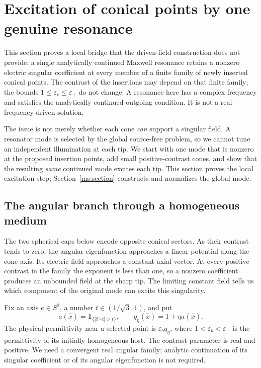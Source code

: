 \section{Excitation of conical points by one genuine resonance}
\label{hs:modal-next-section}

This section proves a local bridge that the driven-field construction
does not provide: a single analytically continued Maxwell resonance
retains a nonzero electric singular coefficient at every member of a
finite family of newly inserted conical points.  The contrast of the
insertions may depend on that finite family; the bounds
$1\leq\varepsilon_r\leq\varepsilon_+$ do not change.  A resonance here
has a complex frequency and satisfies the analytically continued
outgoing condition.  It is not a real-frequency driven solution.

The issue is not merely whether each cone \emph{can} support a singular
field.  A resonator mode is selected by the global source-free problem,
so we cannot tune an independent illumination at each tip.  We start with
one mode that is nonzero at the proposed insertion points, add small
positive-contrast cones, and show that the resulting \emph{same} continued
mode excites each tip.  This section proves the local excitation step;
Section~\ref{ms:section} constructs and normalizes the global mode.

\subsection{The angular branch through a homogeneous medium}

The two spherical caps below encode opposite conical sectors.  As their
contrast tends to zero, the angular eigenfunction approaches a linear
potential along the cone axis.  Its electric field approaches a constant
axial vector.  At every positive contrast in the family the exponent is
less than one, so a nonzero coefficient produces an unbounded field at
the sharp tip.  The limiting constant field tells us which component of
the original mode can excite this singularity.

Fix an axis $e\in S^2$, a number $t\in(1/\sqrt3,1)$, and put
\begin{equation}
 a(\widehat x)=\mathbf1_{\{|\widehat x\cdot e|>t\}},\qquad
 q_\eta(\widehat x)=1+\eta a(\widehat x).
 \label{hs:modal-angular-material}
\end{equation}
The physical permittivity near a selected point is
$\varepsilon_b q_\eta$, where $1<\varepsilon_b<\varepsilon_+$ is the
permittivity of its initially homogeneous host.  The contrast parameter is real and positive.  We need a convergent
real angular family; analytic continuation of its singular coefficient
or of its angular eigenfunction is not required.

